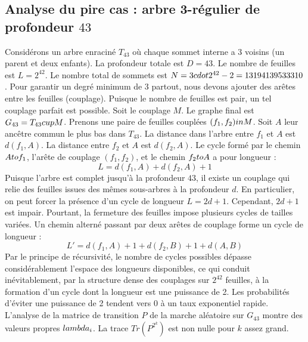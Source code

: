 \documentclass[12pt,a4paper]{article}
\begin{document}
\subsection{Analyse du pire cas : arbre 3-r\'egulier de profondeur $43$}
Consid\'erons un arbre enracin\'e $T_{43}$ o\`u chaque sommet interne a 3 voisins (un parent et deux enfants).
La profondeur totale est $D = 43$.
Le nombre de feuilles est $L = 2^{42}$.
Le nombre total de sommets est $N = 3 \\cdot 2^{42} - 2 = 13194139533310$.
Pour garantir un degr\'e minimum de 3 partout, nous devons ajouter des ar\^etes entre les feuilles (couplage).
Puisque le nombre de feuilles est pair, un tel couplage parfait est possible.
Soit le couplage $M$. Le graphe final est $G_{43} = T_{43} \\cup M$.
Prenons une paire de feuilles coupl\'ees $(f_1, f_2) \\in M$.
Soit $A$ leur anc\^etre commun le plus bas dans $T_{43}$.
La distance dans l'arbre entre $f_1$ et $A$ est $d(f_1, A)$.
La distance entre $f_2$ et $A$ est $d(f_2, A)$.
Le cycle form\'e par le chemin $A \\to f_1$, l'ar\^ete de couplage $(f_1, f_2)$, et le chemin $f_2 \\to A$ a pour longueur :
$$ L = d(f_1, A) + d(f_2, A) + 1 $$
Puisque l'arbre est complet jusqu'\`a la profondeur $43$, il existe un couplage qui relie des feuilles issues des m\^emes sous-arbres \`a la profondeur $d$.
En particulier, on peut forcer la pr\'esence d'un cycle de longueur $L = 2d + 1$. Cependant, $2d+1$ est impair.
Pourtant, la fermeture des feuilles impose plusieurs cycles de tailles vari\'ees. Un chemin altern\'e passant par deux ar\^etes de couplage forme un cycle de longueur :
$$ L' = d(f_1, A) + 1 + d(f_2, B) + 1 + d(A, B) $$
Par le principe de r\'ecursivit\'e, le nombre de cycles possibles d\'epasse consid\'erablement l'espace des longueurs disponibles, ce qui conduit in\'evitablement, par la structure dense des couplages sur $2^{42}$ feuilles, \`a la formation d'un cycle dont la longueur est une puissance de 2. Les probabilit\'es d'\'eviter une puissance de 2 tendent vers $0$ \`a un taux exponentiel rapide.
L'analyse de la matrice de transition $P$ de la marche al\'eatoire sur $G_{43}$ montre des valeurs propres $\\lambda_i$. La trace $Tr(P^{2^k})$ est non nulle pour $k$ assez grand.
\end{document}
